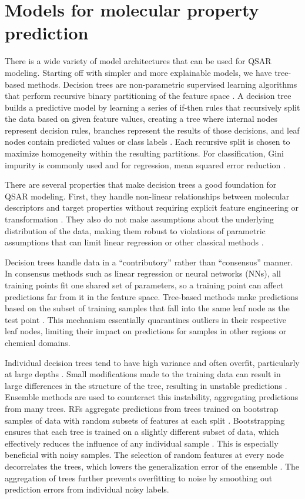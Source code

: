 \section{Models for molecular property prediction}

There is a wide variety of model architectures that can be used for QSAR modeling. Starting off with simpler and more explainable models, we have tree-based methods. Decision trees are non-parametric supervised learning algorithms that perform recursive binary partitioning of the feature space \citep{Breiman1984}. A decision tree builds a predictive model by learning a series of if-then rules that recursively split the data based on given feature values, creating a tree  where internal nodes represent decision rules, branches represent the results of those decisions, and leaf nodes contain predicted values or class labels \citep{Breiman1984}. Each recursive split is chosen to maximize  homogeneity within the resulting partitions. For classification, Gini impurity is commonly used and for regression, mean squared error reduction \citep{Breiman1984}.

There are several properties that make decision trees a good foundation for QSAR modeling. First, they handle non-linear relationships between molecular descriptors and target properties without requiring explicit feature engineering or transformation \citep{Breiman1984}. They also do not make assumptions about the underlying distribution of the data, making them robust to violations of parametric assumptions that can limit linear regression or other classical methods \citep{Breiman1984}. 

Decision trees handle data in a ``contributory'' rather than ``consensus'' manner. In consensus methods such as linear regression or neural networks (NNs), all training points fit one shared set of parameters, so a training point can affect predictions far from it in the feature space. Tree-based methods make predictions based on the subset of training samples that fall into the same leaf node as the test point \citep{Breiman1984}. This mechanism essentially quarantines outliers in their respective leaf nodes, limiting their impact on predictions for samples in other regions or chemical domains. 

Individual decision trees tend to have high variance and often overfit, particularly at large depths \citep{Breiman1984}. Small modifications made to the training data can result in large differences in the structure of the tree, resulting in unstable predictions \citep{Breiman1996}. Ensemble methods are used to counteract this instability, aggregating predictions from many trees. RFs aggregate predictions from trees trained on bootstrap samples of data with random subsets of features at each split \citep{Breiman2001}. Bootstrapping ensures that each tree is trained on a slightly different subset of data, which effectively reduces the influence of any individual sample \citep{Breiman2001}. This is especially beneficial with noisy samples. The selection of random features at every node decorrelates the trees, which lowers the generalization error of the ensemble \citep{Breiman2001}. The aggregation of trees further prevents overfitting to noise by smoothing out prediction errors from individual noisy labels. 

